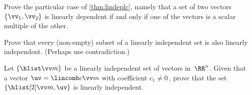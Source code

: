 \begin{exercise} \label{ex:lindeplc} 
Prove the particular case of \autoref{thm:lindeplc}, namely that a set of two vectors \(\{\vv_1,\vv_2\}\) is linearly dependent if and only if one of the vectors is a scalar multiple of the other.
\end{exercise}




\begin{exercise} \label{ex:} 
Prove that every (non-empty) subset of a linearly independent set is also linearly independent.  (Perhaps use contradiction.)
\end{exercise}





\begin{exercise} \label{ex:} 
Let \(\{\hlist\vv m\}\) be a linearly independent set of vectors in~\(\RR^n\).
Given that a vector \(\uv=\lincomb c\vv m\) with coefficient \(c_1\neq0\)\,, prove that the set \(\{\hlist[2]\vv m,\uv\}\) is linearly independent.
\end{exercise}




